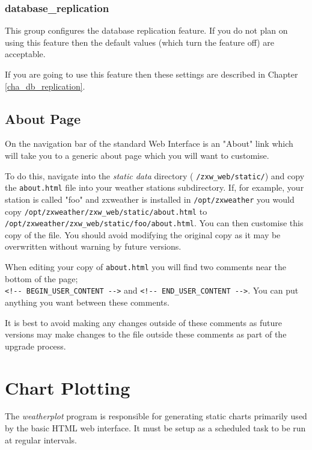 \documentclass[a4paper,10pt,draft]{book}
\begin{document}
\subsubsection{database\_replication}
This group configures the database replication feature. If you do not plan on using this feature then the default values (which turn the feature off) are acceptable.

If you are going to use this feature then these settings are described in Chapter \ref{cha_db_replication}.

\subsection{About Page}
On the navigation bar of the standard Web Interface is an "About" link which will take you to a generic about page which you will want to customise.

To do this, navigate into the \emph{static data} directory ( \verb|/zxw_web/static/|) and copy the \verb|about.html| file into your weather stations subdirectory. If, for example, your station is called "foo" and zxweather is installed in \verb|/opt/zxweather| you would copy \verb|/opt/zxweather/zxw_web/static/about.html| to \\ \verb|/opt/zxweather/zxw_web/static/foo/about.html|. You can then customise this copy of the file. You should avoid modifying the original copy as it may be overwritten without warning by future versions.

When editing your copy of \verb|about.html| you will find two comments near the bottom of the page; \\
\verb|<!-- BEGIN_USER_CONTENT -->| and \verb|<!-- END_USER_CONTENT -->|. You can put anything you want between these comments.

It is best to avoid making any changes outside of these comments as future versions may make changes to the file outside these comments as part of the upgrade process.


\section{Chart Plotting}
\label{sec_chart_plotting}

The \emph{weatherplot} program is responsible for generating static charts primarily used by the basic HTML web interface. It must be setup as a scheduled task to be run at regular intervals.
\end{document}
